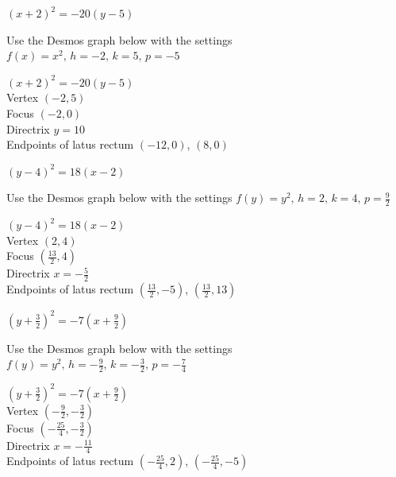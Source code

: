 \documentclass{ximera}
\begin{document}
\begin{question}
\begin{problem}
    $(x+2)^2 = -20(y-5)$

\begin{solution}
Use the Desmos graph below with the settings $f(x)=x^2,\,h=-2,\,k=5,\,p=-5$

\begin{center} 
\end{center}
{$(x+2)^2 = -20(y-5)$}\\
{Vertex $\left(-2, 5\right)$}\\
{Focus $\left(-2, 0 \right)$}\\
{Directrix $y = 10$}\\
{Endpoints of latus rectum $\left(-12, 0 \right)$, $\left(8, 0 \right)$}\\
\end{solution} 
\end{problem}

\begin{problem}\label{paranotfcnthree} 
    $(y-4)^2 = 18(x-2)$

\begin{solution}
Use the Desmos graph below with the settings $f(y)=y^2,\,h=2,\,k=4,\,p=\frac{9}{2}$

\begin{center} 
\end{center}
{$(y-4)^2 = 18(x-2)$}\\
{Vertex $\left(2, 4\right)$}\\
{Focus $\left( \frac{13}{2}, 4 \right)$}\\
{Directrix $x = -\frac{5}{2}$}\\
{Endpoints of latus rectum $\left(\frac{13}{2}, -5 \right)$, $\left(\frac{13}{2}, 13 \right)$}\\
\end{solution}
\end{problem}

\begin{problem}\label{paranotfcnfour} \label{parabolasketchlast}
    $\left(y+ \frac{3}{2}\right)^2 = -7 \left(x+ \frac{9}{2}\right)$

\begin{solution}
Use the Desmos graph below with the settings $f(y)=y^2,\,h=-\frac{9}{2},\,k=-\frac{3}{2},\,p=-\frac{7}{4}$

\begin{center} 
\end{center}
{$\left(y+ \frac{3}{2}\right)^2 = -7 \left(x+ \frac{9}{2}\right)$}\\
{Vertex $\left(-\frac{9}{2}, -\frac{3}{2}\right)$}\\
{Focus $\left( -\frac{25}{4}, -\frac{3}{2} \right)$}\\
{Directrix $x = -\frac{11}{4}$}\\
{Endpoints of latus rectum $\left(-\frac{25}{4}, 2 \right)$, $\left(-\frac{25}{4}, -5 \right)$}\\
\end{solution}
\end{problem}

\end{question}
\end{document}
